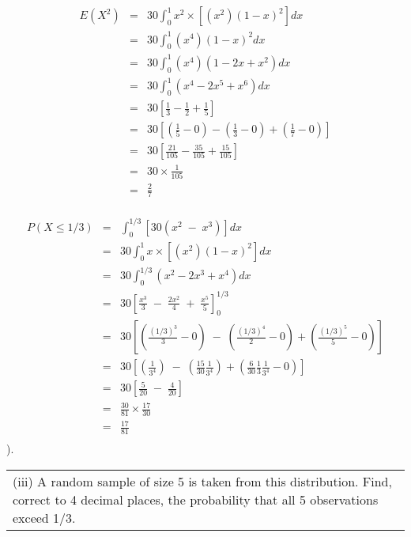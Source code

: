 \documentclass[a4paper,30pt]{article}
\begin{document}
\begin{enumerate}
\begin{eqnarray*}
E(X^2) 
&=& 30 \int^{1}_{0} x^2  \times \left[(x^2)(1-x)^2 \right] dx\\
&=& 30 \int^{1}_{0} (x^4)(1-x)^2 dx\\
&=& 30 \int^{1}_{0} (x^4)(1-2x + x^2) dx\\
&=& 30 \int^{1}_{0} (x^4 -2x^5 + x^6) dx\\
&=& 30 \left[  \frac{1}{3} - \frac{1}{2} + \frac{1}{5}\right]\\
&=& 30 \left[  \left(\frac{1}{5} - 0\right)  -  \left(\frac{1}{3} - 0\right) +  \left(\frac{1}{7} - 0\right) \right]\\
&=& 30 \left[  \frac{21}{105} - \frac{35}{105} + \frac{15}{105}\right]\\
&=& 30 \times \frac{1}{105} \\
&=&  \frac{2}{7} \\
\end{eqnarray*}


\begin{eqnarray*}
P(X \leq 1/3 ) &=& \int^{1/3}_{0} [30(x^2\;-\;x^3)] dx \\
&=& 30 \int^{1}_{0} x  \times \left[(x^2)(1-x)^2\right] dx\\
&=& 30 \int^{1/3}_{0} (x^2 -2x^3 + x^4) dx\\
&=& 30 \left[ \frac{x^3}{3}  \;-\;  \frac{2x^2}{4} \; + \; \frac{x^5}{5}  \right]^{1/3}_{0}\\
&=& 30 \left[ \left( \frac{(1/3)^3}{3}- 0 \right) \;-\; \left( \frac{(1/3)^4}{2}- 0 \right) +  \left( \frac{(1/3)^5}{5}- 0 \right) \right]\\
&=& 30 \left[ \left( \frac{1}{3^4} \right) \;-\; \left( \frac{15}{30}\frac{1}{3^4} \right) +  \left( \frac{6}{30} \frac{1}{3}\frac{1}{3^4}- 0 \right) \right]\\
&=& 30 \left[  \frac{5}{20} \;-\; \frac{4}{20} \right]\\
&=&  \frac{30}{81} \times \frac{17}{30} \\
&=&  \frac{17}{81}\\
\end{eqnarray*}
).


\begin{table}[ht!]
     \centering
     \begin{tabular}{|p{15cm}|}
     \hline        
\noindent 
(iii) A random sample of size 5 is taken from this distribution. Find, correct to 4 decimal places, the probability that all 5 observations exceed 1/3.



\end{tabular}
\end{table}
\end{enumerate}
\end{document}
